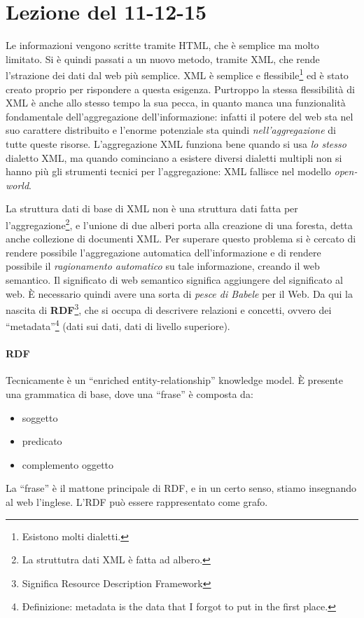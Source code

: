 \section{Lezione del 11-12-15}

Le informazioni vengono scritte tramite HTML, che \`e semplice ma molto limitato. Si \`e quindi passati a un nuovo metodo, tramite XML, che rende l'strazione dei dati dal web pi\`u semplice. XML \`e semplice e flessibile\footnote{Esistono molti dialetti.} ed \`e stato creato proprio per rispondere a questa esigenza. Purtroppo la stessa flessibilit\`a di XML \`e anche allo stesso tempo la sua pecca, in quanto manca una funzionalit\`a fondamentale dell'aggregazione dell'informazione: infatti il potere del web sta nel suo carattere distribuito e l'enorme potenziale sta quindi \textit{nell'aggregazione} di tutte queste risorse. L'aggregazione XML funziona bene quando si usa \textit{lo stesso} dialetto XML, ma quando cominciano a esistere diversi dialetti multipli non si hanno pi\`u gli strumenti tecnici per l'aggregazione: XML fallisce nel modello \textit{open-world}.

La struttura dati di base di XML non \`e una struttura dati fatta per l'aggregazione\footnote{La struttutra dati XML \`e fatta ad albero.}, e l'unione di due alberi porta alla creazione di una foresta, detta anche collezione di documenti XML. Per superare questo problema si \`e cercato di rendere possibile l'aggregazione automatica dell'informazione e di rendere possibile il \textit{ragionamento automatico} su tale informazione, creando il web semantico. Il significato di web semantico significa aggiungere del significato al web. \`E necessario quindi avere una sorta di \textit{pesce di Babele} per il Web. Da qui la nascita di \textbf{RDF}\footnote{Significa Resource Description Framework}, che si occupa di descrivere relazioni e concetti, ovvero dei ``metadata''\footnote{Ðefinizione: metadata is the data that I forgot to put in the first place.} (dati sui dati, dati di livello superiore).

\paragraph*{RDF}Tecnicamente \`e un ``enriched entity-relationship'' knowledge model. \`E presente una grammatica di base, dove una ``frase'' \`e composta da:
\begin{itemize}

\item soggetto
\item predicato
\item complemento oggetto
  
\end{itemize}
La ``frase'' \`e il mattone principale di RDF, e in un certo senso, stiamo insegnando al web l'inglese. L'RDF pu\`o essere rappresentato come grafo.

